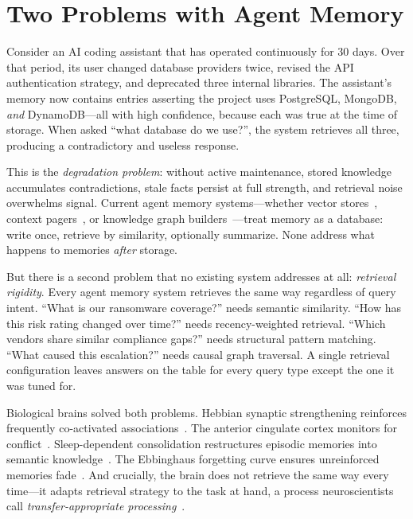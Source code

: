 \documentclass{article}
\begin{document}
\section{Two Problems with Agent Memory}
\label{sec:intro}

Consider an AI coding assistant that has operated continuously for 30 days. Over that period, its user changed database providers twice, revised the API authentication strategy, and deprecated three internal libraries. The assistant's memory now contains entries asserting the project uses PostgreSQL, MongoDB, \emph{and} DynamoDB---all with high confidence, because each was true at the time of storage. When asked ``what database do we use?'', the system retrieves all three, producing a contradictory and useless response.

This is the \emph{degradation problem}: without active maintenance, stored knowledge accumulates contradictions, stale facts persist at full strength, and retrieval noise overwhelms signal. Current agent memory systems---whether vector stores~\citep{mem0}, context pagers~\citep{memgpt}, or knowledge graph builders~\citep{zep,magma}---treat memory as a database: write once, retrieve by similarity, optionally summarize. None address what happens to memories \emph{after} storage.

But there is a second problem that no existing system addresses at all: \emph{retrieval rigidity}. Every agent memory system retrieves the same way regardless of query intent. ``What is our ransomware coverage?'' needs semantic similarity. ``How has this risk rating changed over time?'' needs recency-weighted retrieval. ``Which vendors share similar compliance gaps?'' needs structural pattern matching. ``What caused this escalation?'' needs causal graph traversal. A single retrieval configuration leaves answers on the table for every query type except the one it was tuned for.

Biological brains solved both problems. Hebbian synaptic strengthening reinforces frequently co-activated associations~\citep{hebb1949}. The anterior cingulate cortex monitors for conflict~\citep{botvinick2004}. Sleep-dependent consolidation restructures episodic memories into semantic knowledge~\citep{diekelmann2010}. The Ebbinghaus forgetting curve ensures unreinforced memories fade~\citep{ebbinghaus1885}. And crucially, the brain does not retrieve the same way every time---it adapts retrieval strategy to the task at hand, a process neuroscientists call \emph{transfer-appropriate processing}~\citep{morris1977}.
\end{document}
